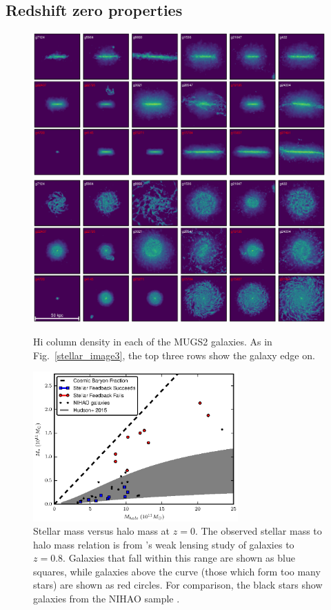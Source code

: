 \subsection{Redshift zero properties}
\begin{figure}
    \includegraphics[width=\textwidth]{figures3/column_edge.eps}
    \includegraphics[width=\textwidth]{figures3/column_face.eps}
    \caption[HI column density images for MUGS2 galaxies]{{\sc Hi} column
    density in each of the MUGS2 galaxies.  As in Fig.~\ref{stellar_image3}, the
    top three rows show the galaxy edge on.}
    \label{gas_column3}
\end{figure}
\begin{figure}
    \includegraphics[width=0.7\textwidth]{figures3/SMHMR.eps}
    \caption[MUGS2 stellar mass to halo mass relation]{Stellar mass versus halo
    mass at $z=0$.  The observed stellar mass to halo mass relation is from
    \citet{Hudson2015}'s weak lensing study of galaxies to $z=0.8$.  Galaxies
    that fall within this range are shown as blue squares, while galaxies above
    the curve (those which form too many stars) are shown as red circles.  For
    comparison, the black stars show galaxies from the NIHAO sample
    \citep{Wang2015}.}
    \label{SMHMR3}
\end{figure}
